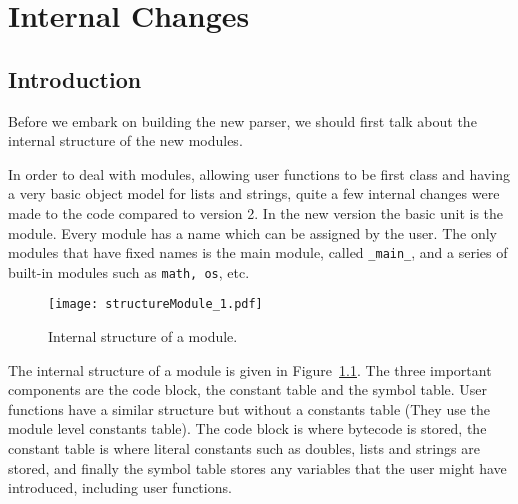 {\bfseries\slshape\sffamily\color{ChapterTitleColor} \chapter{Internal Changes}} \label{chap:internalChanges}

\section{Introduction}

Before we embark on building the new parser, we should first talk about the internal structure of the new modules.

In order to deal with modules, allowing user functions to be first class and having a very basic object model for lists and strings, quite a few internal changes were made to the code compared to version 2. In the new version the basic unit is the module. Every module has a name which can be assigned by the user. The only modules that have fixed names is the main module, called {\tt _main_}, and a series of built-in modules such as {\tt math, os}, etc.

\begin{figure}[htpb]
\centering
\texttt{[image: structureModule\_1.pdf]}
\caption{Internal structure of a module.}
\label{fig:StructureModule1}
\end{figure}

The internal structure of a module is given in Figure~\ref{fig:StructureModule1}. The three important components are the code block, the constant table and the symbol table. User functions have a similar structure but without a constants table (They use the module level constants table). The code block is where bytecode is stored, the constant table is where literal constants such as doubles, lists and strings are stored, and finally the symbol table stores any variables that the user might have introduced, including user functions.

%
%
%
%
%

